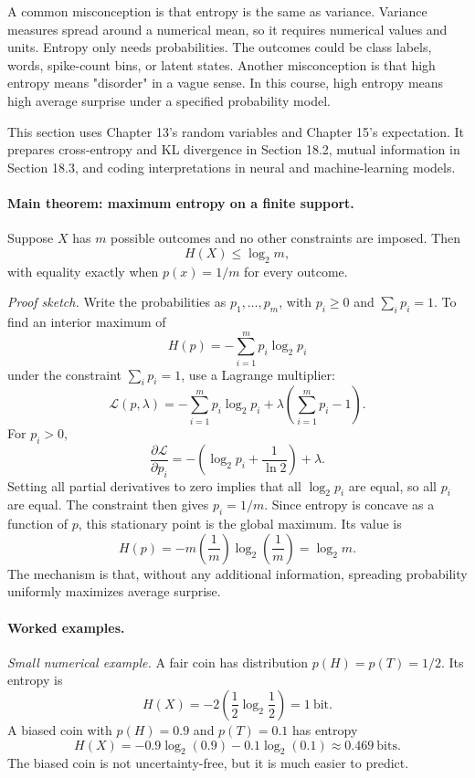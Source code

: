 A common misconception is that entropy is the same as variance. Variance measures spread around a numerical mean, so it requires numerical values and units. Entropy only needs probabilities. The outcomes could be class labels, words, spike-count bins, or latent states. Another misconception is that high entropy means "disorder" in a vague sense. In this course, high entropy means high average surprise under a specified probability model.

This section uses Chapter 13's random variables and Chapter 15's expectation. It prepares cross-entropy and KL divergence in Section 18.2, mutual information in Section 18.3, and coding interpretations in neural and machine-learning models.

\paragraph{Main theorem: maximum entropy on a finite support.}
Suppose \(X\) has \(m\) possible outcomes and no other constraints are imposed. Then
\[
\boxed{
H(X)\le \log_2 m,
}
\]
with equality exactly when \(p(x)=1/m\) for every outcome.

\emph{Proof sketch.}
Write the probabilities as \(p_1,\ldots,p_m\), with \(p_i\ge 0\) and \(\sum_i p_i=1\). To find an interior maximum of
\[
H(p)=-\sum_{i=1}^m p_i\log_2 p_i
\]
under the constraint \(\sum_i p_i=1\), use a Lagrange multiplier:
\[
\mathcal L(p,\lambda)
=-\sum_{i=1}^m p_i\log_2 p_i+\lambda\left(\sum_{i=1}^m p_i-1\right).
\]
For \(p_i>0\),
\[
\frac{\partial \mathcal L}{\partial p_i}
=-\left(\log_2 p_i+\frac{1}{\ln 2}\right)+\lambda.
\]
Setting all partial derivatives to zero implies that all \(\log_2 p_i\) are equal, so all \(p_i\) are equal. The constraint then gives \(p_i=1/m\). Since entropy is concave as a function of \(p\), this stationary point is the global maximum. Its value is
\[
H(p)=-m\left(\frac{1}{m}\right)\log_2\left(\frac{1}{m}\right)
=\log_2 m.
\]
The mechanism is that, without any additional information, spreading probability uniformly maximizes average surprise.

\paragraph{Worked examples.}
\emph{Small numerical example.}
A fair coin has distribution \(p(H)=p(T)=1/2\). Its entropy is
\[
H(X)=-2\left(\frac12\log_2\frac12\right)=1\ \text{bit}.
\]
A biased coin with \(p(H)=0.9\) and \(p(T)=0.1\) has entropy
\[
H(X)=-0.9\log_2(0.9)-0.1\log_2(0.1)\approx 0.469\ \text{bits}.
\]
The biased coin is not uncertainty-free, but it is much easier to predict.

